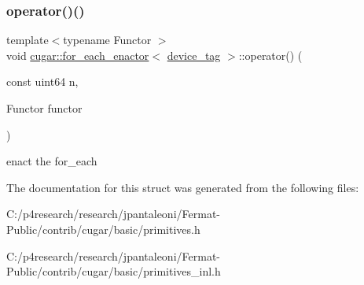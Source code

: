 \subsubsection{\texorpdfstring{operator()()}{operator()()}\hspace{0.1cm}{\footnotesize\ttfamily [2/2]}}
{\footnotesize\ttfamily template$<$typename Functor $>$ \\
void \hyperlink{structcugar_1_1for__each__enactor}{cugar\+::for\+\_\+each\+\_\+enactor}$<$ \hyperlink{structcugar_1_1device__tag}{device\+\_\+tag} $>$\+::operator() (\begin{DoxyParamCaption}\item[{const uint64}]{n,  }\item[{Functor}]{functor }\end{DoxyParamCaption})\hspace{0.3cm}{\ttfamily [inline]}}

enact the for\+\_\+each 

The documentation for this struct was generated from the following files\+:\begin{DoxyCompactItemize}
\item 
C\+:/p4research/research/jpantaleoni/\+Fermat-\/\+Public/contrib/cugar/basic/primitives.\+h\item 
C\+:/p4research/research/jpantaleoni/\+Fermat-\/\+Public/contrib/cugar/basic/primitives\+\_\+inl.\+h\end{DoxyCompactItemize}
